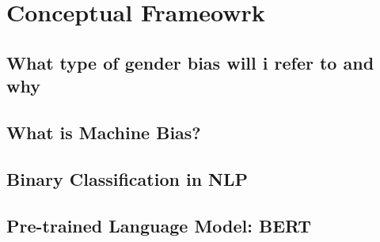 \chapter{Conceptual Frameowrk}

\section{What type of gender bias will i refer to and why}

\section{What is Machine Bias?}


\section{Binary Classification in NLP}

\section{Pre-trained Language Model: BERT}
